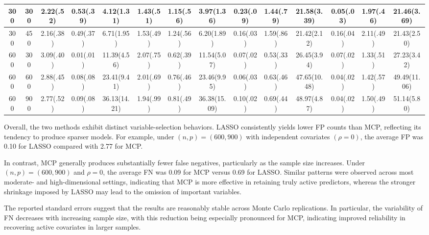 \documentclass[twoside]{article}
\begin{document}
\begin{table}[h]
\begin{tabular}{|c|c|ccc|ccc|ccc|ccc|}
		300 & 300
		& 2.22(.52) & 0.53(.39) & 4.12(1.31)
		& 1.43(.51) & 1.15(.56) & 3.97(1.36)
		& 0.23(.09) & 1.44(.79) & 21.58(3.39)
		& 0.05(.03) & 1.97(.46) & 21.46(3.69)
		\\
		\hline
		
		300 & 450
		& 2.16(.38) & 0.49(.37) & 6.71(1.95)
		& 1.53(.49) & 1.24(.56) & 6.20(1.89)
		& 0.16(.03) & 1.59(.86) & 21.42(2.12)
		& 0.16(.04) & 2.11(.49) & 21.43(2.50)
		\\
		\hline
		
		600 & 300
		& 3.09(.40) & 0.01(.01) & 11.39(4.56)
		& 2.07(.75) & 0.62(.39) & 11.54(5.07)
		& 0.07(.02) & 0.53(.33) & 26.45(3.94)
		& 0.07(.02) & 1.33(.51) & 27.23(3.42)
		\\
		\hline
		
		600 & 600
		& 2.88(.45) & 0.08(.08) & 23.41(9.41)
		& 2.01(.69) & 0.76(.46) & 23.46(9.95)
		& 0.06(.03) & 0.63(.46) & 47.65(10.48)
		& 0.04(.02) & 1.42(.57) & 49.49(11.06)
		\\
		\hline
		
		600 & 900
		& 2.77(.52) & 0.09(.08) & 36.13(14.21)
		& 1.94(.99) & 0.81(.49) & 36.38(15.09)
		& 0.10(.02) & 0.69(.44) & 48.97(4.87)
		& 0.04(.02) & 1.50(.49) & 51.14(5.80)
		\\
		\hline
		
	\end{tabular}
\end{table}


Overall, the two methods exhibit distinct variable-selection behaviors. LASSO consistently yields lower FP counts than MCP, reflecting its tendency to produce sparser models. For example, under $(n,p)=(600,900)$ with independent covariates $(\rho=0)$, the average FP was 0.10 for LASSO compared with 2.77 for MCP.

In contrast, MCP generally produces substantially fewer false negatives, particularly as the sample size increases. Under $(n,p)=(600,900)$ and $\rho=0$, the average FN was 0.09 for MCP versus 0.69 for LASSO. Similar patterns were observed across most moderate- and high-dimensional settings, indicating that MCP is more effective in retaining truly active predictors, whereas the stronger shrinkage imposed by LASSO may lead to the omission of important variables.

The reported standard errors suggest that the results are reasonably stable across Monte Carlo replications. In particular, the variability of FN decreases with increasing sample size, with this reduction being especially pronounced for MCP, indicating improved reliability in recovering active covariates in larger samples.
\end{document}
